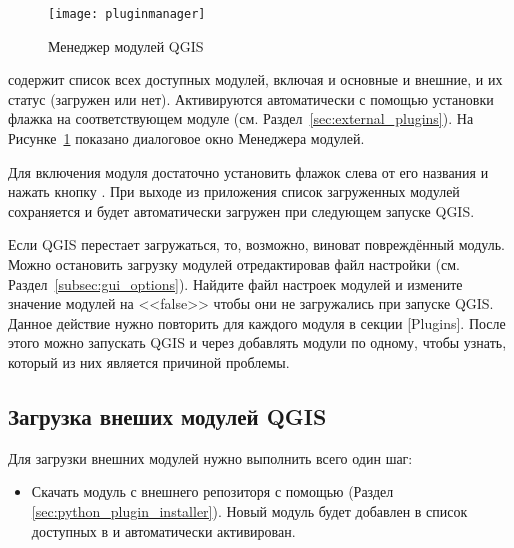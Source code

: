\begin{figure}[ht]
   \centering
   \texttt{[image: pluginmanager]}
   \caption{Менеджер модулей QGIS \nixcaption}\label{fig:pluginmanager}\smallskip
\end{figure}

 содержит список всех доступных модулей,
включая и основные и внешние, и их статус (загружен или нет).
Активируются автоматически с помощью установки флажка на соответствующем
модуле (см. Раздел~\ref{sec:external_plugins}).
На Рисунке~\ref{fig:pluginmanager} показано диалоговое окно Менеджера
модулей.

Для включения модуля достаточно установить флажок слева от его названия
и нажать кнопку . При выходе из приложения список
загруженных модулей сохраняется и будет автоматически загружен при
следующем запуске QGIS.

\begin{Tip}\caption{\textsc{Повреждённые модули}}
Если QGIS перестает загружаться, то, возможно, виноват повреждённый
модуль. Можно остановить загрузку модулей отредактировав файл настройки
(см. Раздел~\ref{subsec:gui_options}). Найдите файл настроек модулей и
измените значение модулей на <<false>> чтобы они не загружались при
запуске QGIS.
\normalfont
Данное действие нужно повторить для каждого модуля в секции [Plugins].
После этого можно запускать QGIS и через 
добавлять модули по одному, чтобы узнать, который из них является
причиной проблемы.
\end{Tip}

\subsection{Загрузка внеших модулей QGIS}\label{sec:load_external_plugin}

Для загрузки внешних модулей нужно выполнить всего один шаг:

\begin{itemize}[label=--]
\item Скачать модуль с внешнего репозиторя с помощью
 (Раздел \ref{sec:python_plugin_installer}).
Новый модуль будет добавлен в список доступных в
 и автоматически активирован.
\end{itemize}

